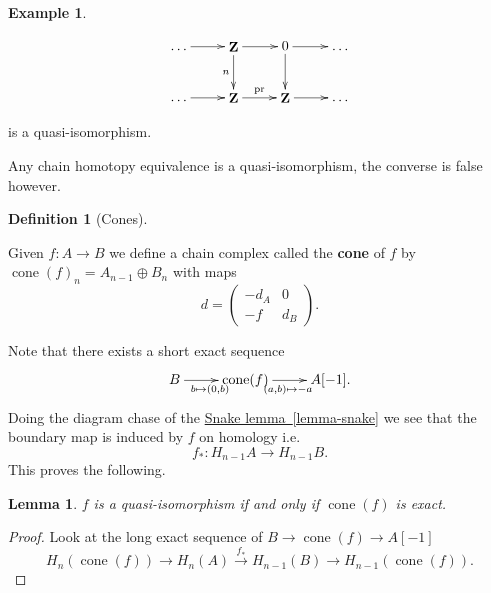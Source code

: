 \documentclass[10pt,]{book}
\newcommand{\terminology}[1]{\textbf{#1}}
\theoremstyle{plain}
\newtheorem{lemma}[theorem]{Lemma}
\theoremstyle{definition}
\newtheorem{definition}[theorem]{Definition}
\newtheorem{example}[theorem]{Example}
\numberwithin{equation}{section}
\renewenvironment{figure}%
{\begin{mbxfigure}\setcounter{mbxfigure}{\value{theorem}}\stepcounter{theorem}}%
{\end{mbxfigure}}
\DeclareMathOperator{\cone}{cone}
\DeclareMathOperator{\ZZ}{\mathbf{Z}}
\begin{document}
\begin{example}\label{example-6}
\begin{figure}
\centering
\[
                \xymatrix{
                  \dots\ar[r] &\ZZ \ar[r]\ar[d]_n &0 \ar[r]\ar[d] &\dots \\
                  \dots\ar[r] &\ZZ \ar[r]^{\text{pr}} &\ZZ \ar[r] &\dots
                }
              \]\end{figure}

            is a quasi-isomorphism.
          \end{example}
\par
Any chain homotopy equivalence is a quasi-isomorphism, the converse is false however.%
\begin{definition}[Cones]\label{definition-15}

            Given \(f\colon A \to B\) we define a chain complex called the \terminology{cone} of \(f\) by \(\cone(f)_n = A_{n-1} \oplus B_n\) with maps \[d = \begin{pmatrix}-d_A & 0 \\ -f & d_B\end{pmatrix}.\]\end{definition}
\par

          Note that there exists a short exact sequence
          \[
            \xymatrix{B \ar[r]_{b\mapsto (0,b)}& \cone(f) \ar[r]_{(a,b)\mapsto -a}& A[-1].}
          \]
          Doing the diagram chase of the \hyperref[lemma-snake]{Snake lemma~\ref*{lemma-snake}} we see that the boundary map is induced by \(f\) on homology i.e. \[f_*\colon H_{n-1}A \to H_{n-1}B.\]
          This proves the following.
\begin{lemma}\label{lemma-3}
\(f\) is a quasi-isomorphism if and only if \(\cone(f)\) is exact.\end{lemma}
\begin{proof}

            Look at the long exact sequence of \(B \to \cone(f) \to A[-1]\)\[
              H_{n}(\cone(f)) \to H_n(A) \xrightarrow{f_*} H_{n-1}(B) \to H_{n-1}(\cone(f)).
            \]\end{proof}
\typeout{************************************************}
\typeout{************************************************}
\end{document}
